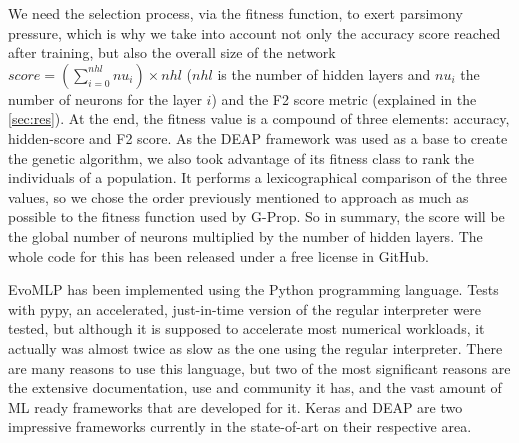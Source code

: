 \documentclass[conference]{IEEEtran}\usepackage[]{graphicx}\usepackage[]{color}
\begin{document}
We need the selection process, via the fitness function, to exert parsimony pressure, which is why
we take into account not only the accuracy score reached after
training, but also the overall size of the network $score = (\sum_{i=0}^{nhl} nu_{i}) \times nhl$ ($nhl$ is the number of hidden layers and $nu_{i}$ the number
of neurons for the layer $i$) and the F2 score metric (explained in the
\autoref{sec:res}). At the end, the fitness value is a compound of
three elements: accuracy, hidden-score and F2 score. As the DEAP framework
\cite{deap-ga} was used as a base to create the genetic algorithm, we also
took advantage of its fitness class \cite{deap-fitness} to rank the individuals
of a population. It performs a lexicographical comparison of the three values,
so we chose the order previously mentioned to approach as much as possible to
the fitness function used by G-Prop.
%
%
%         
%
So in summary, the score will be the
global number of neurons multiplied by the number of hidden layers.
%
The whole code for this has been released under a free license in
GitHub. %

{\sf EvoMLP} has been implemented using the Python programming language. Tests with pypy, an accelerated, just-in-time version of the regular interpreter were tested, but although it is supposed to accelerate most numerical workloads, it actually was almost twice as slow as the one using the regular interpreter. There are
many reasons to use this language, but two of the most significant reasons are
the extensive documentation, use and community it has, and the vast amount of
ML ready frameworks that are developed for it. Keras and DEAP are two impressive
frameworks currently in the state-of-art on their respective area.
\end{document}
